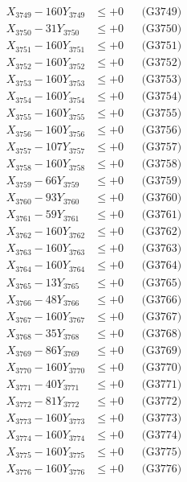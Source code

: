 \documentclass[a4paper,10pt]{article}
\begin{document}
{\begin{align}
X_{3749} - 160Y_{3749} &\leq +0 && \text{(G3749)} \\
X_{3750} - 31Y_{3750} &\leq +0 && \text{(G3750)} \\
\allowbreak
X_{3751} - 160Y_{3751} &\leq +0 && \text{(G3751)} \\
X_{3752} - 160Y_{3752} &\leq +0 && \text{(G3752)} \\
X_{3753} - 160Y_{3753} &\leq +0 && \text{(G3753)} \\
X_{3754} - 160Y_{3754} &\leq +0 && \text{(G3754)} \\
X_{3755} - 160Y_{3755} &\leq +0 && \text{(G3755)} \\
X_{3756} - 160Y_{3756} &\leq +0 && \text{(G3756)} \\
X_{3757} - 107Y_{3757} &\leq +0 && \text{(G3757)} \\
X_{3758} - 160Y_{3758} &\leq +0 && \text{(G3758)} \\
X_{3759} - 66Y_{3759} &\leq +0 && \text{(G3759)} \\
X_{3760} - 93Y_{3760} &\leq +0 && \text{(G3760)} \\
\allowbreak
X_{3761} - 59Y_{3761} &\leq +0 && \text{(G3761)} \\
X_{3762} - 160Y_{3762} &\leq +0 && \text{(G3762)} \\
X_{3763} - 160Y_{3763} &\leq +0 && \text{(G3763)} \\
X_{3764} - 160Y_{3764} &\leq +0 && \text{(G3764)} \\
X_{3765} - 13Y_{3765} &\leq +0 && \text{(G3765)} \\
X_{3766} - 48Y_{3766} &\leq +0 && \text{(G3766)} \\
X_{3767} - 160Y_{3767} &\leq +0 && \text{(G3767)} \\
X_{3768} - 35Y_{3768} &\leq +0 && \text{(G3768)} \\
X_{3769} - 86Y_{3769} &\leq +0 && \text{(G3769)} \\
X_{3770} - 160Y_{3770} &\leq +0 && \text{(G3770)} \\
\allowbreak
X_{3771} - 40Y_{3771} &\leq +0 && \text{(G3771)} \\
X_{3772} - 81Y_{3772} &\leq +0 && \text{(G3772)} \\
X_{3773} - 160Y_{3773} &\leq +0 && \text{(G3773)} \\
X_{3774} - 160Y_{3774} &\leq +0 && \text{(G3774)} \\
X_{3775} - 160Y_{3775} &\leq +0 && \text{(G3775)} \\
X_{3776} - 160Y_{3776} &\leq +0 && \text{(G3776)} \\

\end{align}}
\end{document}
